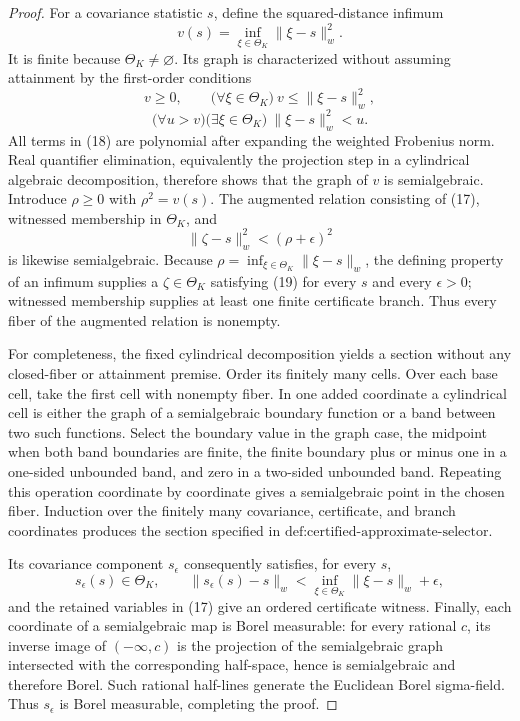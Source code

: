 \documentclass{article}
\begin{document}
\begin{proof}
For a covariance statistic \(s\), define the squared-distance infimum
\[
 v(s)=\inf_{\xi\in\Theta_K}\lVert\xi-s\rVert_w^2.
\]
It is finite because \(\Theta_K\ne\varnothing\).  Its graph is characterized without assuming attainment by the first-order conditions
\[
 v\ge0,\qquad
 \bigl(\forall\xi\in\Theta_K\bigr)\ v\le\lVert\xi-s\rVert_w^2,
\]
\[
 \bigl(\forall u>v\bigr)\bigl(\exists\xi\in\Theta_K\bigr)
 \ \lVert\xi-s\rVert_w^2<u. \tag{18}
\]
All terms in (18) are polynomial after expanding the weighted Frobenius norm.  Real quantifier elimination, equivalently the projection step in a cylindrical algebraic decomposition, therefore shows that the graph of \(v\) is semialgebraic.  Introduce \(\rho\ge0\) with \(\rho^2=v(s)\).  The augmented relation consisting of (17), witnessed membership in \(\Theta_K\), and
\[
 \lVert\zeta-s\rVert_w^2<(\rho+\epsilon)^2 \tag{19}
\]
is likewise semialgebraic.  Because \(\rho=\inf_{\xi\in\Theta_K}\lVert\xi-s\rVert_w\), the defining property of an infimum supplies a \(\zeta\in\Theta_K\) satisfying (19) for every \(s\) and every \(\epsilon>0\); witnessed membership supplies at least one finite certificate branch.  Thus every fiber of the augmented relation is nonempty.

For completeness, the fixed cylindrical decomposition yields a section without any closed-fiber or attainment premise.  Order its finitely many cells.  Over each base cell, take the first cell with nonempty fiber.  In one added coordinate a cylindrical cell is either the graph of a semialgebraic boundary function or a band between two such functions.  Select the boundary value in the graph case, the midpoint when both band boundaries are finite, the finite boundary plus or minus one in a one-sided unbounded band, and zero in a two-sided unbounded band.  Repeating this operation coordinate by coordinate gives a semialgebraic point in the chosen fiber.  Induction over the finitely many covariance, certificate, and branch coordinates produces the section specified in \(\text{def:certified-approximate-selector}\).

Its covariance component \(s_\epsilon\) consequently satisfies, for every \(s\),
\[
 s_\epsilon(s)\in\Theta_K,
 \qquad
 \lVert s_\epsilon(s)-s\rVert_w
 <\inf_{\xi\in\Theta_K}\lVert\xi-s\rVert_w+\epsilon, \tag{20}
\]
and the retained variables in (17) give an ordered certificate witness.  Finally, each coordinate of a semialgebraic map is Borel measurable: for every rational \(c\), its inverse image of \(( -\infty,c)\) is the projection of the semialgebraic graph intersected with the corresponding half-space, hence is semialgebraic and therefore Borel.  Such rational half-lines generate the Euclidean Borel sigma-field.  Thus \(s_\epsilon\) is Borel measurable, completing the proof.
\end{proof}
\end{document}
